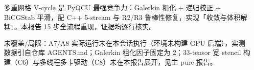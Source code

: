 \documentclass[UTF8]{ctexart}
\begin{document}
\begin{conclbox}
多重网格 V-cycle 是 PyQCU 最强竞争力：Galerkin 粗化 + 递归校正 + BiCGStab 平滑，配 C++ 5-stream 与 R2/R3 鲁棒性修复，实现「收敛与体积解耦」。本报告 15 步全流程重现，证据均逐行核实。
\end{conclbox}

\begin{warnbox}
未覆盖/局限：A7/A8 实际运行未在本会话执行（环境未构建 GPU 后端），实测数据引自仓库 AGENTS.md；Galerkin 粗化因子固定为 2；33-tensor 宽 stencil 构建（C6）与多线程多卡驱动（C8）未在本报告展开，见主 pure 报告。
\end{warnbox}
\end{document}
